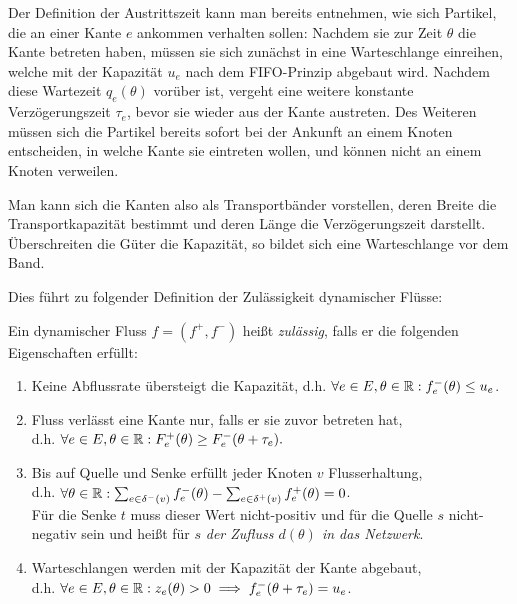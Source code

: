 Der Definition der Austrittszeit kann man bereits entnehmen, wie sich Partikel, die an einer Kante $e$ ankommen verhalten  sollen:
Nachdem sie zur Zeit $\theta$ die Kante betreten haben, müssen sie sich zunächst in eine Warteschlange einreihen, welche mit der Kapazität $u_e$ nach dem FIFO-Prinzip abgebaut wird.
Nachdem diese Wartezeit $q_e(\theta)$ vorüber ist, vergeht eine weitere konstante Verzögerungszeit $\tau_e$, bevor sie wieder aus der Kante austreten.
Des Weiteren müssen sich die Partikel bereits sofort bei der Ankunft an einem Knoten entscheiden, in welche Kante sie eintreten wollen, und können nicht an einem Knoten verweilen.

Man kann sich die Kanten also als Transportbänder vorstellen, deren Breite die Transportkapazität bestimmt und deren Länge die Verzögerungszeit darstellt.
Überschreiten die Güter die Kapazität, so bildet sich eine Warteschlange vor dem Band.

Dies führt zu folgender Definition der Zulässigkeit dynamischer Flüsse:

\begin{definition}
	Ein dynamischer Fluss $f=(f^+, f^-)$ heißt \emph{zulässig}, falls er die folgenden Eigenschaften erfüllt:
	\begin{enumerate}[label=(F\arabic*)]
		\item\label{def-feasible-flow-capacity} Keine Abflussrate übersteigt die Kapazität, d.h. $\forall e\in E, \theta\in\mathbb{R}: f_e^-(\theta)\leq u_e$.
		\item\label{def-feasible-flow-no-negative-flow} Fluss verlässt eine Kante nur, falls er sie zuvor betreten hat,\\ d.h. $\forall e\in E, \theta\in\mathbb{R}: F_e^+(\theta) \geq F_e^-(\theta + \tau_e).$
		\item\label{def-feasible-flow-no-flow-at-node} Bis auf Quelle und Senke erfüllt jeder Knoten $v$ Flusserhaltung,\\
		d.h. $\forall\theta\in\mathbb{R}: \sum_{e\in\delta^-(v)}f^-_e(\theta) - \sum_{e\in\delta^+(v)} f_e^+(\theta) = 0$.\\
		Für die Senke $t$ muss dieser Wert nicht-positiv und für die Quelle $s$ nicht-negativ sein und heißt für $s$ \emph{der Zufluss $d(\theta)$ in das Netzwerk}.
		\item\label{def-feasible-flow-queue-with-capacity} Warteschlangen werden mit der Kapazität der Kante abgebaut,\\ d.h. $\forall e\in E, \theta\in\mathbb{R}: z_e(\theta) > 0 \implies f_e^-(\theta + \tau_e) = u_e$.
	\end{enumerate}
\end{definition}

